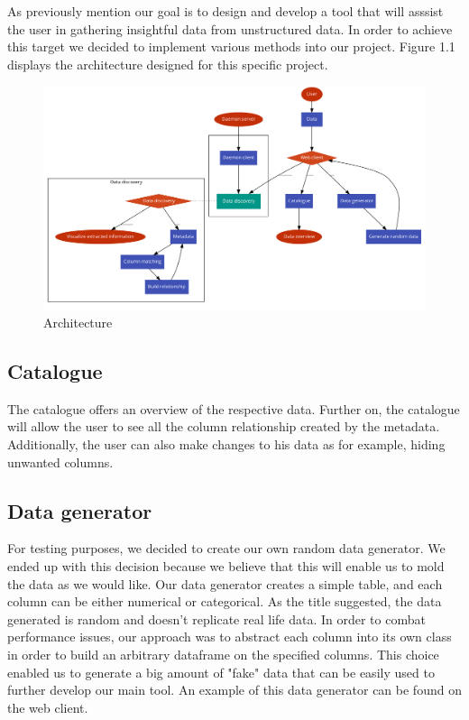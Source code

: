 As previously mention our goal is to design and develop a tool that will asssist the user in gathering insightful data from unstructured data.
In order to achieve this target we decided to implement various methods into our project. Figure 1.1 displays the architecture designed for this specific project.  
\begin {figure} [h]
    \centering
    \includegraphics[width=16cm]{figures/architecture.pdf}
    \caption {Architecture}
    \label {fig:architecture_diagram}
\end{figure}
\vspace{5mm} %
\subsection{Catalogue}
The catalogue offers an overview of the respective data. Further on, the catalogue will allow the user to see all the column relationship created by the metadata. Additionally, the user can also make changes to his data as for example, hiding unwanted columns.
\vspace{5mm} %
\subsection{Data generator}
For testing purposes, we decided to create our own random data generator. We ended up with this decision because we believe that this will enable us to mold the data as we would like. Our data generator creates a simple table, and each column can be either numerical or categorical. As the title suggested, the data generated is random and doesn't replicate real life data. In order to combat performance issues, our approach was to abstract each column into its own class in order to build an arbitrary dataframe
on the specified columns. This choice enabled us to generate a big amount of "fake" data that can be easily used to further develop our main tool. An example of this data generator can be found on the web client.
\vspace{5mm} %
